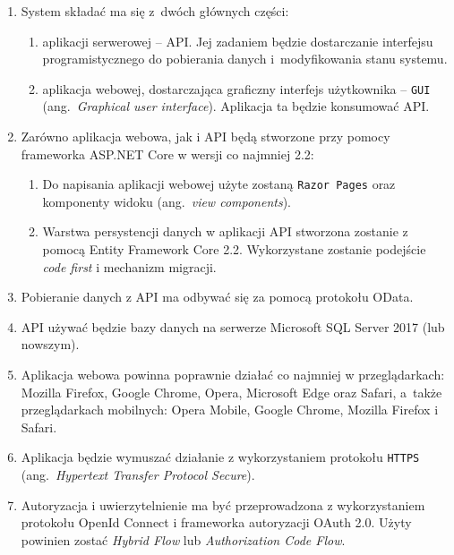 \begin{enumerate}[labelwidth=\widthof{\ref{last-item}},label=\arabic*.]

\item System składać ma się z~dwóch głównych części:
\begin{enumerate}[label=\alph*)]
\item aplikacji serwerowej -- API. Jej zadaniem będzie dostarczanie interfejsu programistycznego do pobierania danych i~modyfikowania stanu systemu.
\item aplikacja webowej, dostarczająca graficzny interfejs użytkownika -- \texttt{GUI} (ang.~\emph{Graphical user interface}). Aplikacja ta będzie konsumować API.
\end{enumerate}

\item Zarówno aplikacja webowa, jak i API będą stworzone przy pomocy frameworka ASP.NET Core w wersji co najmniej 2.2: 
\begin{enumerate}[label=\alph*)]
\item Do napisania aplikacji webowej użyte zostaną \texttt{Razor Pages} oraz komponenty widoku (ang.~\emph{view components}). 
\item Warstwa persystencji danych w aplikacji API stworzona zostanie z pomocą Entity Framework Core 2.2. Wykorzystane zostanie podejście \emph{code first} i mechanizm migracji.
\end{enumerate}

\item Pobieranie danych z API ma odbywać się za pomocą protokołu OData.

\item API używać będzie bazy danych na serwerze Microsoft SQL Server 2017 (lub nowszym).

\item Aplikacja webowa powinna poprawnie działać co najmniej w przeglądarkach: Mozilla Firefox, Google Chrome, Opera, Microsoft Edge oraz Safari, a~także przeglądarkach mobilnych: Opera Mobile, Google Chrome, Mozilla Firefox i Safari.

\item Aplikacja będzie wymuszać działanie z wykorzystaniem protokołu \texttt{HTTPS} (ang.~\emph{Hypertext Transfer Protocol Secure}).

\item Autoryzacja i uwierzytelnienie ma być przeprowadzona z wykorzystaniem protokołu OpenId Connect i frameworka autoryzacji OAuth 2.0. Użyty powinien zostać \emph{Hybrid Flow} lub \emph{Authorization Code Flow}.


\end{enumerate}
